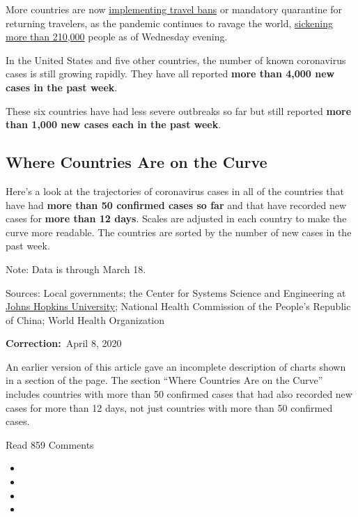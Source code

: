 More countries are now
\href{https://www.nytimes3xbfgragh.onion/article/coronavirus-travel-restrictions.html}{implementing
travel bans} or mandatory quarantine for returning travelers, as the
pandemic continues to ravage the world,
\href{https://www.nytimes3xbfgragh.onion/interactive/2020/world/coronavirus-maps.html}{sickening
more than 210,000} people as of Wednesday evening.

In the United States and five other countries, the number of known
coronavirus cases is still growing rapidly. They have all reported
\textbf{more than 4,000 new cases in the past week}.

These six countries have had less severe outbreaks so far but still
reported \textbf{more than 1,000 new cases each in the past week}.

\hypertarget{where-countries-are-on-the-curve}{%
\subsection{Where Countries Are on the
Curve}\label{where-countries-are-on-the-curve}}

Here's a look at the trajectories of coronavirus cases in all of the
countries that have had \textbf{more than 50 confirmed cases so far} and
that have recorded new cases for \textbf{more than 12 days}. Scales are
adjusted in each country to make the curve more readable. The countries
are sorted by the number of new cases in the past week.

Note: Data is through March 18.

Sources: Local governments; the Center for Systems Science and
Engineering at
\href{https://gisanddata.maps.arcgis.com/apps/opsdashboard/index.html\#/bda7594740fd40299423467b48e9ecf6}{Johns
Hopkins University}; National Health Commission of the People's Republic
of China; World Health Organization

\textbf{Correction:}~April 8, 2020

An earlier version of this article gave an incomplete description of
charts shown in a section of the page. The section ``Where Countries Are
on the Curve'' includes countries with more than 50 confirmed cases that
had also recorded new cases for more than 12 days, not just countries
with more than 50 confirmed cases.

Read 859 Comments

\begin{itemize}
\item
\item
\item
\item
\end{itemize}

